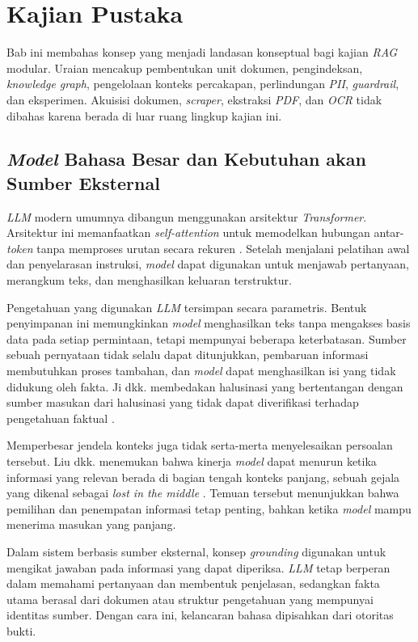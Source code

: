 \chapter[KAJIAN PUSTAKA]{Kajian Pustaka}
\label{chap:kajian-pustaka}

Bab ini membahas konsep yang menjadi landasan konseptual bagi kajian \emph{RAG} modular. Uraian mencakup pembentukan unit dokumen, pengindeksan, \emph{knowledge graph}, pengelolaan konteks percakapan, perlindungan \emph{PII}, \emph{guardrail}, dan eksperimen. Akuisisi dokumen, \emph{scraper}, ekstraksi \emph{PDF}, dan \emph{OCR} tidak dibahas karena berada di luar ruang lingkup kajian ini.

\section{\emph{Model} Bahasa Besar dan Kebutuhan akan Sumber Eksternal}

\emph{LLM} modern umumnya dibangun menggunakan arsitektur \emph{Transformer}. Arsitektur ini memanfaatkan \emph{self-attention} untuk memodelkan hubungan antar-\emph{token} tanpa memproses urutan secara rekuren \parencite{vaswaniAttentionAllYou2023}. Setelah menjalani pelatihan awal dan penyelarasan instruksi, \emph{model} dapat digunakan untuk menjawab pertanyaan, merangkum teks, dan menghasilkan keluaran terstruktur.

Pengetahuan yang digunakan \emph{LLM} tersimpan secara parametris. Bentuk penyimpanan ini memungkinkan \emph{model} menghasilkan teks tanpa mengakses basis data pada setiap permintaan, tetapi mempunyai beberapa keterbatasan. Sumber sebuah pernyataan tidak selalu dapat ditunjukkan, pembaruan informasi membutuhkan proses tambahan, dan \emph{model} dapat menghasilkan isi yang tidak didukung oleh fakta. Ji dkk. membedakan halusinasi yang bertentangan dengan sumber masukan dari halusinasi yang tidak dapat diverifikasi terhadap pengetahuan faktual \parencite{jiSurveyHallucinationNatural2023}.

Memperbesar jendela konteks juga tidak serta-merta menyelesaikan persoalan tersebut. Liu dkk. menemukan bahwa kinerja \emph{model} dapat menurun ketika informasi yang relevan berada di bagian tengah konteks panjang, sebuah gejala yang dikenal sebagai \emph{lost in the middle} \parencite{liuLostMiddle2024}. Temuan tersebut menunjukkan bahwa pemilihan dan penempatan informasi tetap penting, bahkan ketika \emph{model} mampu menerima masukan yang panjang.

Dalam sistem berbasis sumber eksternal, konsep \emph{grounding} digunakan untuk mengikat jawaban pada informasi yang dapat diperiksa. \emph{LLM} tetap berperan dalam memahami pertanyaan dan membentuk penjelasan, sedangkan fakta utama berasal dari dokumen atau struktur pengetahuan yang mempunyai identitas sumber. Dengan cara ini, kelancaran bahasa dipisahkan dari otoritas bukti.

